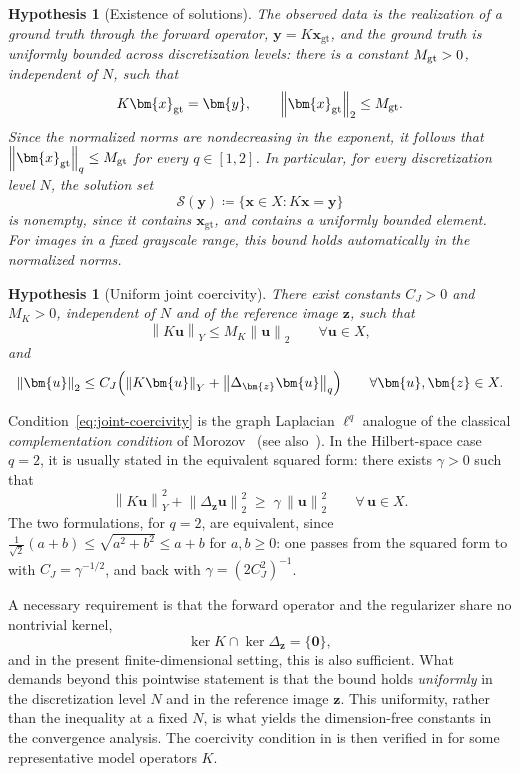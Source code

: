 \documentclass{article}
\newtheorem{hypothesis}[theorem]{Hypothesis}
\theoremstyle{remark}
\newcommand{\gt}{\bm{x}_{\mathrm{gt}}}
\newcommand{\norm}[1]{\left\lVert #1 \right\rVert}
\newcommand{\Ssol}{\mathcal{S}}
\newcommand{\bx}{{\bm{x}}}
\newcommand{\by}{{\bm{y}}}
\newcommand{\bz}{{\bm{z}}}
\newcommand{\bu}{{\bm{u}}}
\begin{document}
\begin{hypothesis}[Existence of solutions]\label{hyp:consistency}
The observed data is the realization of a ground truth through the forward
operator, $\by=K\gt$, and the ground truth is uniformly bounded across
discretization levels: there is a constant $M_{\rm gt}>0$, independent of $N$, such that
\[
K\gt=\by,
\qquad
\norm{\gt}_2\le M_{\rm gt} .
\]
Since the normalized norms are nondecreasing in the exponent, it follows that
$\norm{\gt}_q\le M_{\rm gt}$ for every $q\in[1,2]$.
In particular, for every discretization level $N$, the solution set
\[
\Ssol(\by)\coloneqq\{\bx\in X:K\bx=\by\}
\]
is nonempty, since it contains $\gt$, and contains a uniformly bounded element.
For images in a fixed grayscale range, this bound holds automatically in the
normalized norms.
\end{hypothesis}

\begin{hypothesis}[Uniform joint coercivity]\label{hyp:joint-coercivity}
There exist constants $C_J>0$ and $M_K>0$, independent of $N$ and of the reference image $\bz$, such that
\begin{equation*}
\norm{K\bu}_Y\le M_K\norm{\bu}_2
\qquad\forall \bu\in X,
\end{equation*}
and
\begin{equation}\label{eq:joint-coercivity}
\norm{\bu}_2
\le C_J\Bigl(\norm{K\bu}_Y+\norm{\Delta_\bz \bu}_q\Bigr)
\qquad\forall \bu,\bz\in X .
\end{equation}
\end{hypothesis}

Condition~\cref{eq:joint-coercivity} is the graph Laplacian $\ell^q$ analogue of
the classical \emph{complementation condition} of Morozov~\cite{morozov2012methods}
(see also~\cite[Chapter~8]{engl1996regularization}). In the Hilbert-space case $q=2$, it is usually stated in the equivalent squared
form: there exists $\gamma>0$ such that
\[
\norm{K\bu}_Y^2+\norm{\Delta_\bz\bu}_2^2 \;\geq\; \gamma\,\norm{\bu}_2^2
\qquad\forall\,\bu\in X .
\]
The two formulations, for $q=2$, are equivalent, since $\tfrac{1}{\sqrt2}(a+b)\leq\sqrt{a^2+b^2}
\leq a+b$ for $a,b\geq0$: one passes from the squared form to
 with $C_J=\gamma^{-1/2}$, and back with
$\gamma=(2C_J^2)^{-1}$.

A necessary requirement is that
the forward operator and the regularizer share no nontrivial kernel,
\[
\ker K\cap\ker\Delta_\bz=\{\boldsymbol 0\},
\]
and in the present finite-dimensional setting, this is also sufficient. What  demands
beyond this pointwise statement is that the bound holds \emph{uniformly} in the
discretization level $N$ and in the reference image $\bz$. This uniformity, rather
than the inequality at a fixed $N$, is what yields the dimension-free constants in
the convergence analysis.
The coercivity condition in  is then verified in  for some representative model operators $K$.
\end{document}

